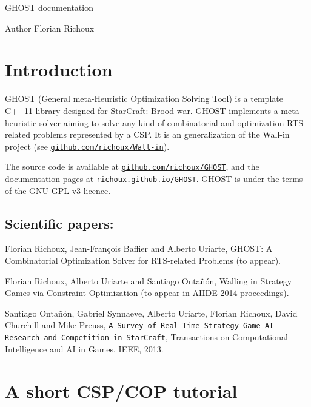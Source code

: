 G\+H\+O\+ST documentation \begin{DoxyAuthor}{Author}
Florian Richoux
\end{DoxyAuthor}
\section*{Introduction }

G\+H\+O\+ST (General meta-\/\+Heuristic Optimization Solving Tool) is a template C++11 library designed for Star\+Craft\+: Brood war. G\+H\+O\+ST implements a meta-\/heuristic solver aiming to solve any kind of combinatorial and optimization R\+T\+S-\/related problems represented by a C\+SP. It is an generalization of the Wall-\/in project (see \href{https://github.com/richoux/Wall-in}{\tt github.\+com/richoux/\+Wall-\/in}).

The source code is available at \href{https://github.com/richoux/GHOST}{\tt github.\+com/richoux/\+G\+H\+O\+ST}, and the documentation pages at \href{http://richoux.github.io/GHOST}{\tt richoux.\+github.\+io/\+G\+H\+O\+ST}. G\+H\+O\+ST is under the terms of the G\+NU G\+PL v3 licence.

\subsection*{Scientific papers\+: }


\begin{DoxyItemize}
\item Florian Richoux, Jean-\/\+François Baffier and Alberto Uriarte, G\+H\+O\+ST\+: A Combinatorial Optimization Solver for R\+T\+S-\/related Problems (to appear).
\item Florian Richoux, Alberto Uriarte and Santiago Ontañón, Walling in Strategy Games via Constraint Optimization (to appear in A\+I\+I\+DE 2014 proceedings).
\item Santiago Ontañón, Gabriel Synnaeve, Alberto Uriarte, Florian Richoux, David Churchill and Mike Preuss, \href{http://pagesperso.lina.univ-nantes.fr/~richoux-f/publications/tciaig13.pdf}{\tt A Survey of Real-\/\+Time Strategy Game AI Research and Competition in Star\+Craft}, Transactions on Computational Intelligence and AI in Games, I\+E\+EE, 2013.
\end{DoxyItemize}

\section*{A short C\+S\+P/\+C\+OP tutorial }

